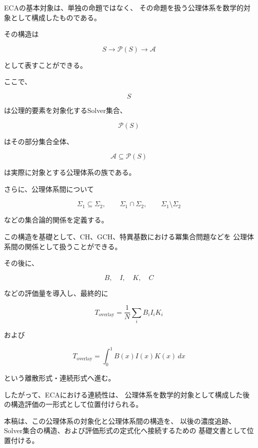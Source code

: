 \documentclass[11pt]{article}
\begin{document}
ECAの基本対象は、単独の命題ではなく、
その命題を扱う公理体系を数学的対象として構成したものである。

その構造は

\[
S
\longrightarrow
\mathcal{P}(S)
\longrightarrow
\mathscr{A}
\]

として表すことができる。

ここで、

\[
S
\]

は公理的要素を対象化するSolver集合、

\[
\mathcal{P}(S)
\]

はその部分集合全体、

\[
\mathscr{A}\subseteq\mathcal{P}(S)
\]

は実際に対象とする公理体系の族である。

さらに、公理体系間について

\[
\Sigma_1\subseteq\Sigma_2,
\qquad
\Sigma_1\cap\Sigma_2,
\qquad
\Sigma_1\setminus\Sigma_2
\]

などの集合論的関係を定義する。

この構造を基礎として、CH、GCH、特異基数における冪集合問題などを
公理体系間の関係として扱うことができる。

その後に、

\[
B,\quad I,\quad K,\quad C
\]

などの評価量を導入し、最終的に

\[
T_{\mathrm{overlay}}
=
\frac{1}{N}\sum_i B_iI_iK_i
\]

および

\[
T_{\mathrm{overlay}}
=
\int_0^1B(x)I(x)K(x)\,dx
\]

という離散形式・連続形式へ進む。

したがって、ECAにおける連続性は、
公理体系を数学的対象として構成した後の構造評価の一形式として位置付けられる。

本稿は、この公理体系の対象化と公理体系間の構造を、
以後の濃度追跡、Solver集合の構造、および評価形式の定式化へ接続するための
基礎文書として位置付ける。
\end{document}

